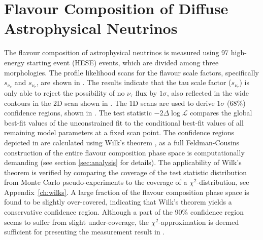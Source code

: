 \section{Flavour Composition of Diffuse Astrophysical Neutrinos}
\label{sec:flavour_results}
The flavour composition of astrophysical neutrinos is measured using 97 high-energy starting event (HESE) events, which are divided among three morphologies. The profile likelihood scans for the flavour scale factors, specifically $s_{\nu_{e}}$ and $s_{\nu_{\tau}}$, are shown in . The results indicate that the tau scale factor ($s_{\nu_{\tau}}$) is only able to reject the possibility of no $\nu_{\tau}$ flux by $1\sigma$, also reflected in the wide contours in the 2D scan shown in . The 1D scans are used to derive $1\sigma$ (68\%) confidence regions, shown in . The test statistic $-2\Delta \log \mathcal{L}$ compares the global best-fit values of the unconstrained fit to the conditional best-fit values of all remaining model parameters at a fixed scan point. The confidence regions depicted in  are calculated using Wilk's theorem  , as a full Feldman-Cousins construction of the entire flavour composition phase space is computationally demanding (see section \ref{sec:analysis} for details). The applicability of Wilk's theorem is verified by comparing the coverage of the test statistic distribution from Monte Carlo pseudo-experiments to the coverage of a $\chi^2$-distribution, see Appendix~\ref{ch:wilks}. A large fraction of the flavour composition phase space is found to be slightly over-covered, indicating that Wilk's theorem yields a conservative confidence region. Although a part of the 90\% confidence region seems to suffer from slight under-coverage, the $\chi^2$-approximation is deemed sufficient for presenting the measurement result in . 

